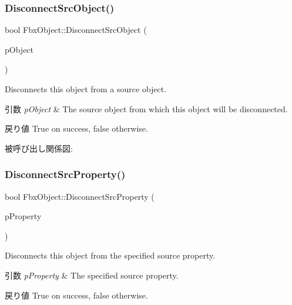 \subsubsection{\texorpdfstring{Disconnect\+Src\+Object()}{DisconnectSrcObject()}}
{\footnotesize\ttfamily bool Fbx\+Object\+::\+Disconnect\+Src\+Object (\begin{DoxyParamCaption}\item[{\hyperlink{class_fbx_object}{Fbx\+Object} $\ast$}]{p\+Object }\end{DoxyParamCaption})}

Disconnects this object from a source object. 
\begin{DoxyParams}{引数}
{\em p\+Object} & The source object from which this object will be disconnected. \\
\hline
\end{DoxyParams}
\begin{DoxyReturn}{戻り値}
{\ttfamily True} on success, {\ttfamily false} otherwise. 
\end{DoxyReturn}
被呼び出し関係図\+:
\mbox{\label{class_fbx_object_a545423b1e5060fcad8784bd0aa0432b6}} 
\subsubsection{\texorpdfstring{Disconnect\+Src\+Property()}{DisconnectSrcProperty()}}
{\footnotesize\ttfamily bool Fbx\+Object\+::\+Disconnect\+Src\+Property (\begin{DoxyParamCaption}\item[{const \hyperlink{class_fbx_property}{Fbx\+Property} \&}]{p\+Property }\end{DoxyParamCaption})}

Disconnects this object from the specified source property. 
\begin{DoxyParams}{引数}
{\em p\+Property} & The specified source property. \\
\hline
\end{DoxyParams}
\begin{DoxyReturn}{戻り値}
{\ttfamily True} on success, {\ttfamily false} otherwise. 
\end{DoxyReturn}
\mbox{\label{class_fbx_object_ae2fe13bc65c1ffe2c2338bc2a2740429}} 
